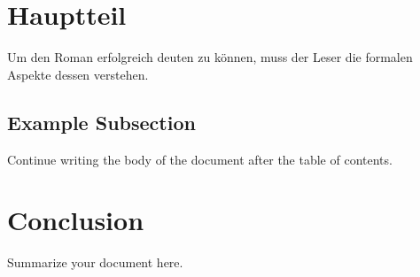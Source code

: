 \documentclass[12pt,a4paper]{article}
\begin{document}
\newpage 

\section{Hauptteil}
Um den Roman erfolgreich deuten zu können, muss der Leser die formalen Aspekte dessen verstehen.

\subsection{Example Subsection}
Continue writing the body of the document after the table of contents.

\section{Conclusion}
Summarize your document here.
\end{document}

